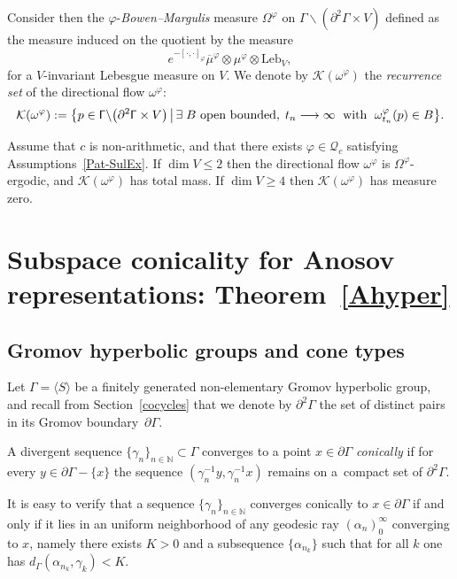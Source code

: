 \documentclass[AHL,Unicode,longabstracts,MathTools]{cedram}
\newcommand{\Fundeb}{\mathrm{Leb}}
\renewcommand{\sf}[1]{{\mathsf{#1}}}
\newcommand{\G}{\sf{\Gamma}}
\newcommand{\cal}{\mathcal}
\newcommand{\calQ}{\mathcal{Q}}
\newcommand{\N}{\mathbb{N}}
\newcommand{\g}{\gamma}
\newcommand{\bord}{\partial}
\newcommand{\ps}{\mu}
\newcommand{\BM}{\Omega}
\newcommand{\df}{\omega}
\newcommand{\ov}{\overline}
\renewcommand{\/}{\backslash}
\newcommand{\<}{\langle}
\renewcommand{\>}{\rangle}
\renewcommand*{\to}{\mathchoice{\longrightarrow}{\rightarrow}{\rightarrow}{\rightarrow}}
\let\originalleft\left
\let\originalright\right
\renewcommand{\left}{\mathopen{}\mathclose\bgroup\originalleft}
\renewcommand{\right}{\aftergroup\egroup\originalright}
\let\oldexists\exists
\renewcommand*{\exists}{\mathrel{\oldexists}}
\begin{document}
Consider then the $\varphi$-\emph{Bowen--Margulis} measure $\BM^\varphi$ on $\G\/(\bord^2\G\times V)$ defined as the measure induced on the quotient by the measure
\begin{equation}\label{forBM}
e^{-[\cdot,\cdot]_\varphi}{\ov\ps}^\varphi\otimes\ps^\varphi\otimes \Fundeb_{V},
\end{equation}
for a $V$-invariant Lebesgue measure on $V$. We denote by $\cal K(\df^\varphi)$ the \emph{recurrence set} of the directional flow $\df^\varphi$:
\[
\cal K(\df^\varphi):=\left\{p\in\G\/\left(\bord^2\G\times V\right)\,\middle|\, \exists B \text{ open bounded},\; t_n\to \infty \;\text{ with }\; \df^\varphi_{t_n}(p)\in B \right\}.
\]

\begin{coro}
\label{d=2}
Assume that $c$ is non-arithmetic, and that there exists $\varphi\in\calQ_c$ satisfying Assumptions~\ref{Pat-SulEx}. If $\dim V\leq2$ then the directional flow $\df^\varphi$ is $\BM^\varphi$-ergodic, and $\cal K(\df^\varphi)$ has total mass. If $\dim V\geq4$ then $\cal K(\df^\varphi)$ has measure zero.
\end{coro}



\section{Subspace conicality for Anosov representations: Theorem~\ref{Ahyper}}\label{Anosov}

\subsection{Gromov hyperbolic groups and cone types}\label{cont}
Let $\G=\langle S\rangle$ be a finitely generated non-elementary Gromov hyperbolic group, and recall from Section~\ref{cocycles} that we denote by $\bord^2\G$ the set of distinct pairs in its Gromov boundary~$\bord\G$.



\begin{defi}\label{conicalsequence}
A divergent sequence $\{\g_n\}_{n\in\N}\subset\G$ converges to a point $x\in\bord\G$ \emph{conically} if for every $y\in\bord\G-\{x\}$ the sequence $(\g_n^{-1}y,\g_n^{-1}x)$ remains on a~compact set of $\bord^2\G$.
\end{defi}

\begin{rema}\label{r.conicalgeodesic}
It is easy to verify that a sequence $\{\g_n\}_{n\in\N}$ converges conically to $x\in\bord\G$ if and only if it lies in an uniform neighborhood of any geodesic ray $(\alpha_n)_0^\infty$ converging to $x$, namely there exists $K>0$ and a subsequence $\{\alpha_{n_k}\}$ such that for all $k$ one has $d_\G(\alpha_{n_k},\g_{k})<K$.
\end{rema}
\end{document}
